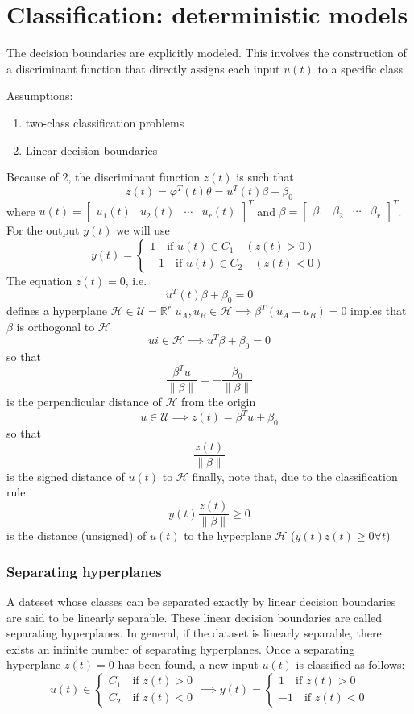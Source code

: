 \documentclass{book}
\theoremstyle{definition}
\theoremstyle{remark}
\theoremstyle{remark}
\begin{document}
\chapter{Classification: deterministic models}
The decision boundaries are explicitly modeled. This involves the construction of a discriminant function that directly assigns each input $u(t)$ to a specific class 

Assumptions:
\begin{enumerate}
    \item two-class classification problems
    \item Linear decision boundaries 
\end{enumerate}
Because of 2, the discriminant function $z(t)$ is such that 
\[
    z(t)=\varphi^T(t)\theta=u^T(t)\beta+\beta_0
\]
where $u(t) =\begin{bmatrix}
    u_1(t) & u_2(t) & \cdots & u_r(t)
\end{bmatrix}^T$ and $\beta = \begin{bmatrix}
    \beta_1 & \beta_2 & \cdots & \beta_r
\end{bmatrix}^T$.
For the output $y(t)$ we will use 
\[
    y(t) = \begin{cases}
        1 \quad \text{if } u(t)\in C_1 \quad (z(t)>0)\\
        -1 \quad \text{if } u(t)\in C_2 \quad (z(t)<0)
    \end{cases}
\]
The equation $z(t)=0$, i.e. 
\[
    u^T(t)\beta+\beta_0=0
\]
defines a hyperplane $\mathcal{H}\in\mathcal{U}=\mathbb{R}^r$
$u_A,u_B \in \mathcal{H} \implies \beta^T(u_A-u_B)=0$ imples that $\beta$ is orthogonal to $\mathcal{H}$ 
\[
    ui\in\mathcal{H}\implies u^T\beta+\beta_0=0
\]
so that  
\[
    \displaystyle\frac{\beta^Tu}{\|\beta\|}=-\displaystyle\frac{\beta_0}{\|\beta\|}
\]
is the perpendicular distance of $\mathcal{H}$ from the origin 
\[
    u\in\mathcal{U}\implies z(t) =\beta^Tu+\beta_0
\]
so that 
\[
    \displaystyle\frac{z(t)}{\|\beta\|}
\]
is the signed distance of $u(t)$ to $\mathcal{H}$
finally, note that, due to the classification rule 
\[
    y(t)\displaystyle\frac{z(t)}{\|\beta\|}\geq 0
\]
is the distance (unsigned) of $u(t)$ to the hyperplane $\mathcal{H}$ ($y(t)z(t)\geq 0 \forall t$)
\subsection{Separating hyperplanes}
A dateset whose classes can be separated exactly by linear decision boundaries are said to be linearly separable. These linear decision boundaries are called separating hyperplanes. In general, if the dataset is linearly separable, there exists an infinite number of separating hyperplanes. Once a separating hyperplane $z(t)=0$ has been found, a new input $u(t)$ is classified as follows:
\[
    u(t) \in \begin{cases}
        C_1 \quad \text{if } z(t)>0\\
        C_2 \quad \text{if } z(t)<0
    \end{cases} \implies y(t) = \begin{cases}
    1 \quad \text{if } z(t)>0\\
    -1 \quad \text{if } z(t)<0
   \end{cases}
\]
\end{document}
